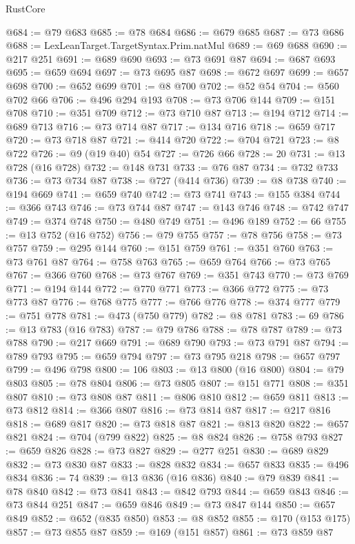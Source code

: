\begin{lexlean}{RustCore}
\begin{coremodule}
@684 := @79 @683
@685 := @78 @684
@686 := @679 @685
@687 := @73 @686
@688 := LexLeanTarget.TargetSyntax.Prim.natMul
@689 := @69 @688
@690 := @217 @251
@691 := @689 @690
@693 := @73 @691 @87
@694 := @687 @693
@695 := @659 @694
@697 := @73 @695 @87
@698 := @672 @697
@699 := @657 @698
@700 := @652 @699
@701 := @8 @700
@702 := @52 @54
@704 := @560 @702 @66
@706 := @496 @294 @193
@708 := @73 @706 @144
@709 := @151 @708
@710 := @351 @709
@712 := @73 @710 @87
@713 := @194 @712
@714 := @689 @713
@716 := @73 @714 @87
@717 := @134 @716
@718 := @659 @717
@720 := @73 @718 @87
@721 := @414 @720
@722 := @704 @721
@723 := @8 @722
@726 := @9 (@19 @40) @54
@727 := @726 @66
@728 := 20
@731 := @13 @728 (@16 @728)
@732 := @148 @731
@733 := @76 @87
@734 := @732 @733
@736 := @73 @734 @87
@738 := @727 (@414 @736)
@739 := @8 @738
@740 := @194 @669
@741 := @659 @740
@742 := @73 @741
@743 := @155 @384
@744 := @366 @743
@746 := @73 @744 @87
@747 := @143 @746
@748 := @742 @747
@749 := @374 @748
@750 := @480 @749
@751 := @496 @189
@752 := 66
@755 := @13 @752 (@16 @752)
@756 := @79 @755
@757 := @78 @756
@758 := @73 @757
@759 := @295 @144
@760 := @151 @759
@761 := @351 @760
@763 := @73 @761 @87
@764 := @758 @763
@765 := @659 @764
@766 := @73 @765
@767 := @366 @760
@768 := @73 @767
@769 := @351 @743
@770 := @73 @769
@771 := @194 @144
@772 := @770 @771
@773 := @366 @772
@775 := @73 @773 @87
@776 := @768 @775
@777 := @766 @776
@778 := @374 @777
@779 := @751 @778
@781 := @473 (@750 @779)
@782 := @8 @781
@783 := 69
@786 := @13 @783 (@16 @783)
@787 := @79 @786
@788 := @78 @787
@789 := @73 @788
@790 := @217 @669
@791 := @689 @790
@793 := @73 @791 @87
@794 := @789 @793
@795 := @659 @794
@797 := @73 @795 @218
@798 := @657 @797
@799 := @496 @798
@800 := 106
@803 := @13 @800 (@16 @800)
@804 := @79 @803
@805 := @78 @804
@806 := @73 @805
@807 := @151 @771
@808 := @351 @807
@810 := @73 @808 @87
@811 := @806 @810
@812 := @659 @811
@813 := @73 @812
@814 := @366 @807
@816 := @73 @814 @87
@817 := @217 @816
@818 := @689 @817
@820 := @73 @818 @87
@821 := @813 @820
@822 := @657 @821
@824 := @704 (@799 @822)
@825 := @8 @824
@826 := @758 @793
@827 := @659 @826
@828 := @73 @827
@829 := @277 @251
@830 := @689 @829
@832 := @73 @830 @87
@833 := @828 @832
@834 := @657 @833
@835 := @496 @834
@836 := 74
@839 := @13 @836 (@16 @836)
@840 := @79 @839
@841 := @78 @840
@842 := @73 @841
@843 := @842 @793
@844 := @659 @843
@846 := @73 @844 @251
@847 := @659 @846
@849 := @73 @847 @144
@850 := @657 @849
@852 := @652 (@835 @850)
@853 := @8 @852
@855 := @170 (@153 @175)
@857 := @73 @855 @87
@859 := @169 (@151 @857)
@861 := @73 @859 @87

\end{coremodule}
\end{lexlean}
